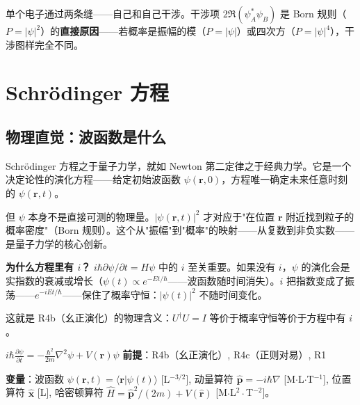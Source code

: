 单个电子通过两条缝——自己和自己干涉。干涉项 $2\Re(\psi_A^*\psi_B)$ 是 Born 规则（$P = |\psi|^2$）的\textbf{直接原因}——若概率是振幅的模（$P=|\psi|$）或四次方（$P=|\psi|^4$），干涉图样完全不同。

\section{Schr\"{o}dinger 方程}

\subsection{物理直觉：波函数是什么}

Schr\"{o}dinger 方程之于量子力学，就如 Newton 第二定律之于经典力学。它是一个决定论性的演化方程——给定初始波函数 $\psi(\mathbf{r},0)$，方程唯一确定未来任意时刻的 $\psi(\mathbf{r},t)$。

但 $\psi$ 本身不是直接可测的物理量。$|\psi(\mathbf{r},t)|^2$ 才对应于"在位置 $\mathbf{r}$ 附近找到粒子的概率密度"（Born 规则）。这个从"振幅"到"概率"的映射——从复数到非负实数——是量子力学的核心创新。

\textbf{为什么方程里有 $i$？} $i\hbar\partial\psi/\partial t = H\psi$ 中的 $i$ 至关重要。如果没有 $i$，$\psi$ 的演化会是实指数的衰减或增长（$\psi(t) \propto e^{-Et/\hbar}$——波函数随时间消失）。$i$ 把指数变成了振荡——$e^{-iEt/\hbar}$——保住了概率守恒：$|\psi(t)|^2$ 不随时间变化。

这就是 R4b（幺正演化）的物理含义：$U^\dagger U = I$ 等价于概率守恒等价于方程中有 $i$。


\begin{lawbox}
  $i\hbar\frac{\partial\psi}{\partial t} = -\frac{\hbar^2}{2m}\nabla^2\psi + V(\mathbf{r})\psi$
  \quad\textbf{前提}：R4b（幺正演化）, R4c（正则对易）, R1
\end{lawbox}

\noindent\textbf{变量}：波函数 $\psi(\mathbf{r},t) = \langle\mathbf{r}|\psi(t)\rangle$ [L$^{-3/2}$], 动量算符 $\hat{\mathbf{p}} = -i\hbar\nabla$ [M$\cdot$L$\cdot$T$^{-1}$],
位置算符 $\hat{\mathbf{x}}$ [L], 哈密顿算符 $\hat{H} = \hat{\mathbf{p}}^2/(2m) + V(\hat{\mathbf{r}})$ [M$\cdot$L$^2\cdot$T$^{-2}$]。

